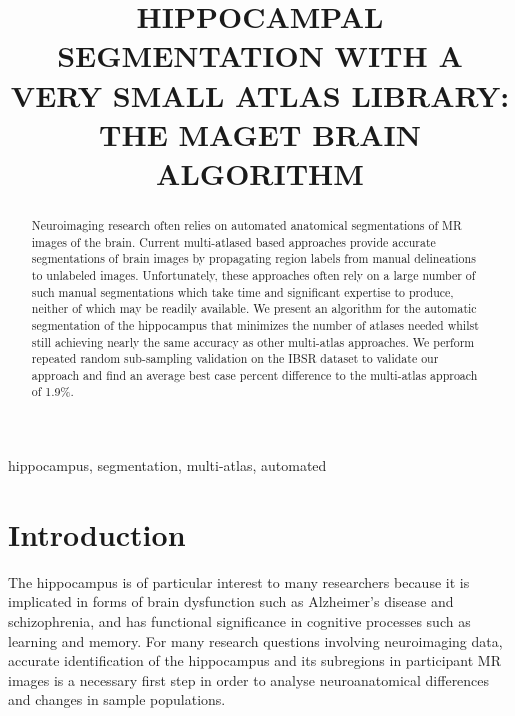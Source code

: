 \documentclass{article}
\title{HIPPOCAMPAL SEGMENTATION WITH A VERY SMALL ATLAS LIBRARY: THE MAGET
BRAIN ALGORITHM}
\begin{document}

\maketitle       

\begin{abstract}
Neuroimaging research often relies on automated anatomical
segmentations of MR images of the brain. Current multi-atlased based
approaches provide accurate segmentations of brain images by
propagating region labels from manual delineations to unlabeled
images.  Unfortunately, these approaches often rely on a large number
of such manual segmentations which take time and significant expertise
to produce, neither of which may be readily available.  We present
an algorithm for the automatic segmentation of the hippocampus that
minimizes the number of atlases needed whilst still achieving nearly
the same accuracy as other multi-atlas approaches.  We perform
repeated random sub-sampling validation on the IBSR dataset to
validate our approach and find an average best case percent difference
to the multi-atlas approach of 1.9\%.

\end{abstract}

\begin{keywords}
hippocampus, segmentation, multi-atlas, automated
\end{keywords}

\section{Introduction}
\label{sec:intro}

The hippocampus is of particular interest to many researchers because it is
implicated in forms of brain dysfunction such as Alzheimer's disease and
schizophrenia, and has functional significance in cognitive processes such as
learning and memory.  For many research questions involving neuroimaging data,
accurate identification of the hippocampus and its subregions in participant MR
images is a necessary first step in order to analyse neuroanatomical
differences and changes in sample populations.  
\end{document}
